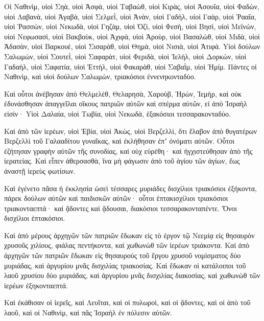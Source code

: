 {\par }{\PP {}Οἱ Ναθινὶμ, υἱοὶ Σηὰ, υἱοὶ Ἀσφὰ, υἱοὶ Ταβαὼθ,
υἱοὶ Κιρὰς, υἱοὶ Ἀσουΐα, υἱοὶ Φαδὼν,
υἱοὶ Λαβανὰ, υἱοὶ Ἀγαβὰ, υἱοὶ Σελμεῒ,
υἱοὶ Ἀνὰν, υἱοὶ Γαδὴλ, υἱοὶ Γαὰρ,
υἱοὶ Ῥααΐα, υἱοὶ Ῥασσὼν, υἱοὶ Νεκωδὰ,
υἱοὶ Γηζὰμ, υἱοὶ Ὀζὶ, υἱοὶ Φεσὴ,
υἱοὶ Βησὶ, υἱοὶ Μεϊνὼν, υἱοὶ Νεφωσασὶ,
υἱοὶ Βακβοὺκ, υἱοὶ Ἀχιφὰ, υἱοὶ Ἀροὺρ,
υἱοὶ Βασαλὼθ, υἱοὶ Μιδὰ, υἱοὶ Ἀδασὰν,
υἱοὶ Βαρκουὲ, υἱοὶ Σισαρὰθ, υἱοὶ Θημὰ,
υἱοὶ Νισιὰ, υἱοὶ Ἀτιφά.
Yἱοὶ δούλων Σαλωμὼν, υἱοὶ Σουτεῒ, υἱοὶ Σαφαρὰτ, υἱοὶ Φεριδὰ,
υἱοὶ Ἰελὴλ, υἱοὶ Δορκὼν, υἱοὶ Γαδαὴλ,
υἱοὶ Σαφατία, υἱοὶ Ἐττὴλ, υἱοὶ Φακαρὰθ, υἱοὶ Σαβαῒμ, υἱοὶ Ἠμίμ.
Πάντες οἱ Ναθινὶμ, καὶ υἱοὶ δούλων Σαλωμὼν, τριακόσιοι ἐννενηκονταδύο.
\par }{\PP {}Καὶ οὗτοι ἀνέβησαν ἀπὸ Θελμελὲθ, Θελαρησὰ, Χαροὺβ, Ἠρὼν, Ἰεμὴρ, καὶ οὐκ ἐδυνάσθησαν ἀπαγγεῖλαι οἴκους πατριῶν αὐτῶν καὶ σπέρμα αὐτῶν, εἰ ἀπὸ Ἰσραὴλ εἰσίν·
Yἱοὶ Δαλαία, υἱοὶ Τωβία, υἱοὶ Νεκωδὰ, ἑξακόσιοι τεσσαρακονταδύο.
\par }{\PP {}Καὶ ἀπὸ τῶν ἱερέων, υἱοὶ Ἐβία, υἱοὶ Ἀκὼς, υἱοὶ Βερζελλὶ, ὅτι ἔλαβον ἀπὸ θυγατέρων Βερζελλὶ τοῦ Γαλααδίτου γυναῖκας, καὶ ἐκλήθησαν ἐπʼ ὀνόματι αὐτῶν.
Οὗτοι ἐζήτησαν γραφὴν αὐτῶν τῆς συνοδίας, καὶ οὐχ εὑρέθη· καὶ ἠγχιστεύθησαν ἀπὸ τῆς ἱερατείας.
Καὶ εἶπεν ἀθερσασθὰ, ἵνα μὴ φάγωσιν ἀπὸ τοῦ ἁγίου τῶν ἁγίων, ἕως ἀναστῇ ἱερεὺς φωτίσων.
\par }{\PP {}Καὶ ἐγένετο πᾶσα ἡ ἐκκλησία ὡσεὶ τέσσαρες μυριάδες δισχίλιοι τριακόσιοι ἐξήκοντα,
πάρεκ δούλων αὐτῶν καὶ παιδισκῶν αὐτῶν· οὗτοι ἑπτακισχίλιοι τριακόσιοι τριακονταεπτά· καὶ ᾄδοντες καὶ ᾄδουσαι, διακόσιοι τεσσαρακονταπέντε.
Ὄνοι δισχίλιοι ἑπτακόσιοι.
\par }{\PP {}Καὶ ἀπὸ μέρους ἀρχηγῶν τῶν πατριῶν ἔδωκαν εἰς τὸ ἐργον τῷ Νεεμίᾳ εἰς θησαυρὸν χρυσοῦς χιλίους, φιάλας πεντήκοντα, καὶ χωθωνὼθ τῶν ἱερέων τριάκοντα.
Καὶ ἀπὸ ἀρχηγῶν τῶν πατριῶν ἔδωκαν εἰς θησαυρούς τοῦ ἔργου χρυσοῦ νομίσματος δύο μυριάδας, καὶ ἀργυρίου μνᾶς δισχιλίας τριακοσίας.
Καὶ ἔδωκαν οἱ κατάλοιποι τοῦ λαοῦ χρυσίου δύο μυριάδας, καὶ ἀργυρίου μνᾶς δισχιλίας διακοσίας, καὶ χωθωνὼθ τῶν ἱερέων ἑξηκονταεπτά.
\par }{\PP {}Καὶ ἐκάθισαν οἱ ἱερεῖς, καὶ Λευῖται, καὶ οἱ πυλωροὶ, καὶ οἱ ᾄδοντες, καὶ οἱ ἀπὸ τοῦ λαοῦ, καὶ οἱ Ναθινὶμ, καὶ πᾶς Ἰσραὴλ ἐν πόλεσιν αὐτῶν.

}
